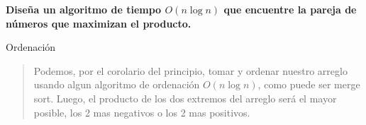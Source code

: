 \textbf{Diseña un algoritmo de tiempo $O(n \log n)$ que encuentre la pareja de números que maximizan el producto.}\vspace{.2cm}

\textcolor{bibi}{Ordenación}
\begin{quote}
    Podemos, por el corolario del principio, tomar y ordenar nuestro arreglo usando algun algoritmo de ordenación $O(n \log n)$, como puede ser merge sort. Luego, el producto de los dos extremos del arreglo será el mayor posible, los 2 mas negativos o los 2 mas positivos. \vspace{.2cm}
\end{quote}